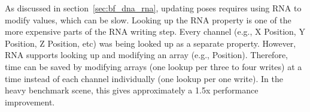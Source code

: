 As discussed in section~\ref{sec:bf_dna_rna}, updating poses requires using RNA to modify values, which can be slow.
Looking up the RNA property is one of the more expensive parts of the RNA writing step.
Every channel (e.g., X Position, Y Position, Z Position, etc) was being looked up as a separate property.
However, RNA supports looking up and modifying an array (e.g., Position).
Therefore, time can be saved by modifying arrays (one lookup per three to four writes) at a time instead of each channel individually (one lookup per one write).
In the heavy benchmark scene, this gives approximately a 1.5x performance improvement.

